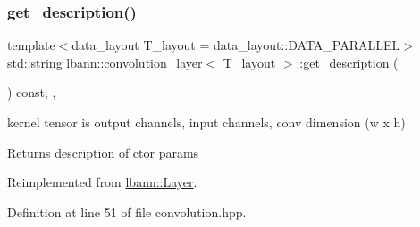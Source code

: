 \subsubsection{\texorpdfstring{get\+\_\+description()}{get\_description()}}
{\footnotesize\ttfamily template$<$data\+\_\+layout T\+\_\+layout = data\+\_\+layout\+::\+D\+A\+T\+A\+\_\+\+P\+A\+R\+A\+L\+L\+EL$>$ \\
std\+::string \hyperlink{classlbann_1_1convolution__layer}{lbann\+::convolution\+\_\+layer}$<$ T\+\_\+layout $>$\+::get\+\_\+description (\begin{DoxyParamCaption}{ }\end{DoxyParamCaption}) const\hspace{0.3cm}{\ttfamily [inline]}, {\ttfamily [override]}, {\ttfamily [virtual]}}



kernel tensor is output channels, input channels, conv dimension (w x h) 

Returns description of ctor params 

Reimplemented from \hyperlink{classlbann_1_1Layer_acc0803d3428914ca1eb5988c4309174a}{lbann\+::\+Layer}.



Definition at line 51 of file convolution.\+hpp.


